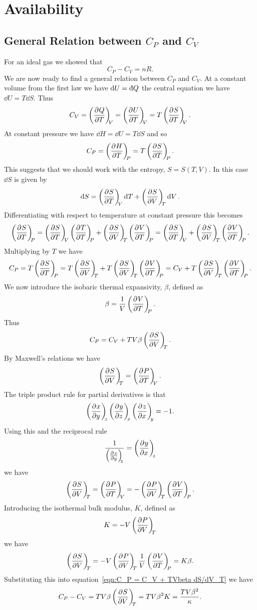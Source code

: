 \documentclass[a4paper]{article}
\newcommand{\ddbar}[1]{\text{\dj}{#1}}
\begin{document}
    \section{Availability}
    \subsection{General Relation between \texorpdfstring{\(C_P\)}{CP} and \texorpdfstring{\(C_V\)}{CV}}
    For an ideal gas we showed that
    \[C_P - C_V = nR.\]
    We are now ready to find a general relation between \(C_P\) and \(C_V\).
    At a constant volume from the first law we have \(\dd{U} = \ddbar{Q}\) the central equation we have \(\dd{U} = T\dd{S}\).
    Thus
    \[C_V = \left(\pdv[]{Q}{T}\right)_{\!\!{V}} = \left(\pdv[]{U}{T}\right)_{\!\!{V}} = T\left(\pdv[]{S}{T}\right)_{\!\!{V}}.\]
    At constant pressure we have \(\dd{H} = \dd{U} = T\dd{S}\) and so
    \[C_P = \left(\pdv[]{H}{T}\right)_{\!\!{P}} = T\left(\pdv[]{S}{T}\right)_{\!\!{P}}.\]
    This suggests that we should work with the entropy, \(S = S(T, V)\).
    In this case \(\dd{S}\) is given by
    \[\dd{S} = \left(\pdv[]{S}{T}\right)_{\!\!{V}}\dd{T} + \left(\pdv[]{S}{V}\right)_{\!\!{T}}\dd{V}.\]
    Differentiating with respect to temperature at constant pressure this becomes
    \[\pdvconst{S}{T}{P} = \pdvconst{S}{T}{V}\pdvconst{T}{T}{P} + \pdvconst{S}{V}{T}\pdvconst{V}{T}{P} = \pdvconst{S}{T}{V} + \pdvconst{S}{V}{T}\pdvconst{V}{T}{P}.\]
    Multiplying by \(T\) we have
    \[C_P = T\pdvconst{S}{T}{P} = T\pdvconst{S}{V}{T} + T\pdvconst{S}{V}{T}\pdvconst{V}{T}{P} = C_V + T\pdvconst{S}{V}{T}\pdvconst{V}{T}{P}.\]
    We now introduce the isobaric thermal expansivity, \(\beta\), defined as
    \[\beta = \frac{1}{V}\left(\pdv[]{V}{T}\right)_{\!\!{P}}.\]
    Thus
    \begin{equation}\label{eqn:C_P = C_V + TVbeta dS/dV_T}
        C_P = C_V + TV\beta\left(\pdv[]{S}{V}\right)_{\!\!{T}}.
    \end{equation}
    By Maxwell's relations we have
    \[\left(\pdv[]{S}{V}\right)_{\!\!{T}} = \left(\pdv[]{P}{T}\right)_{\!\!{V}}.\]
    The triple product rule for partial derivatives is that
    \[\left(\pdv[]{x}{y}\right)_{\!\!{z}}\left(\pdv[]{y}{z}\right)_{\!\!{x}}\left(\pdv[]{z}{x}\right)_{\!\!{y}} = -1.\]
    Using this and the reciprocal rule
    \[\frac{1}{\left(\pdv[]{x}{y}\right)_{\!\!{z}}} = \left(\pdv[]{y}{x}\right)_{\!\!{z}}\]
    we have
    \[\pdvconst{S}{V}{T} = \pdvconst{P}{T}{V} = -\pdvconst{P}{V}{T}\pdvconst{V}{T}{P}.\]
    Introducing the isothermal bulk modulus, \(K\), defined as
    \[K = -V\left(\pdv[]{P}{V}\right)_{\!\!{T}}\]
    we have
    \[\left(\pdv[]{S}{V}\right)_{\!\!{T}} = -V\left(\pdv[]{P}{V}\right)_{\!\!{T}}\frac{1}{V}\left(\pdv[]{V}{T}\right)_{\!\!{P}} = K\beta.\]
    Substituting this into equation~\ref{eqn:C_P = C_V + TVbeta dS/dV_T} we have
    \[C_P - C_V = TV\beta\left(\pdv[]{S}{V}\right)_{\!\!{T}} = TV\beta^2 K = \frac{TV\beta^2}{\kappa}.\]
\end{document}
